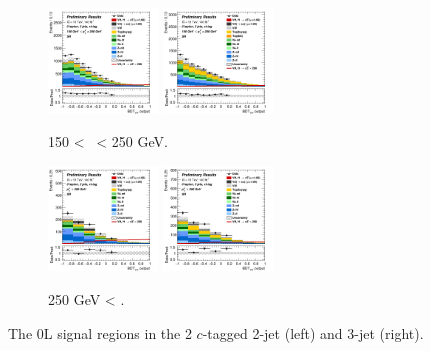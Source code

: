 \vspace*{\fill}

\begin{figure}[h!]
    \centering
    \begin{subfigure}[b]{\textwidth}
        \centering
        \includegraphics[width=0.32\textwidth]{Images/VH/Own_fit/prefit_VHcc/Region_distmva_BMax250_BMin150_DSR_J2_TTypext_T2_L0_Y6051_Prefit.png}
        \includegraphics[width=0.32\textwidth]{Images/VH/Own_fit/prefit_VHcc/Region_distmva_BMax250_BMin150_DSR_J3_TTypext_T2_L0_Y6051_Prefit.png}
        \caption{150 < \ptv\ < 250 GeV.}
        \label{fig:plots_VHcc_OL_150_SR_2c}
    \end{subfigure}
    \begin{subfigure}[b]{\textwidth}
        \centering
        \includegraphics[width=0.32\textwidth]{Images/VH/Own_fit/prefit_VHcc/Region_distmva_BMin250_DSR_J2_TTypext_T2_L0_Y6051_Prefit.png}
        \includegraphics[width=0.32\textwidth]{Images/VH/Own_fit/prefit_VHcc/Region_distmva_BMin250_DSR_J3_TTypext_T2_L0_Y6051_Prefit.png}
        \caption{250 GeV < \ptv.}
        \label{fig:plots_VHcc_OL_250_SR_2c}
    \end{subfigure}
    \caption{The 0L signal regions in the 2 $c$-tagged 2-jet (left) and 3-jet (right).}
    \label{fig:plots_VHcc_OL_SR_2c}
\end{figure} 

